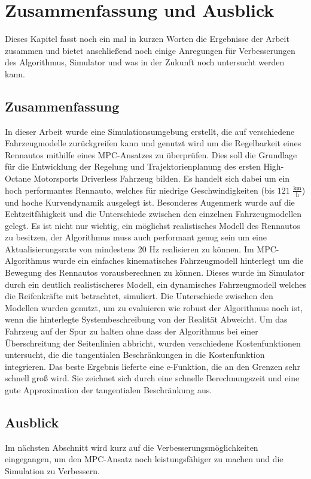 \documentclass{like}
\begin{document}
\chapter[Ausblick]{Zusammenfassung und Ausblick}
Dieses Kapitel fasst noch ein mal in kurzen Worten die Ergebnisse der Arbeit zusammen und bietet anschließend noch einige Anregungen für Verbesserungen des Algorithmus, Simulator und was in der Zukunft noch untersucht werden kann.
\section{Zusammenfassung}
In dieser Arbeit wurde eine Simulationsumgebung erstellt, die auf verschiedene Fahrzeugmodelle zurückgreifen kann und genutzt wird um die Regelbarkeit eines Rennautos mithilfe eines \ac{MPC}-Ansatzes zu überprüfen. Dies soll die Grundlage für die Entwicklung der Regelung und Trajektorienplanung des ersten High-Octane Motorsports Driverless Fahrzeug bilden. Es handelt sich dabei um ein hoch performantes Rennauto, welches für niedrige Geschwindigkeiten (bis $121$ $\frac{\text{km}}{\text{h}}$) und hoche Kurvendynamik ausgelegt ist. Besonderes Augenmerk wurde auf die Echtzeitfähigkeit und die Unterschiede zwischen den einzelnen Fahrzeugmodellen gelegt. Es ist nicht nur wichtig, ein möglichst realistisches Modell des Rennautos zu besitzen, der Algorithmus muss auch performant genug sein um eine Aktualisierungsrate von mindestens 20 Hz realisieren zu können. 
Im \ac{MPC}-Algorithmus wurde ein einfaches kinematisches Fahrzeugmodell hinterlegt um die Bewegung des Rennautos vorausberechnen zu können. Dieses wurde im Simulator durch ein deutlich realistischeres Modell, ein dynamisches Fahrzeugmodell welches die Reifenkräfte mit betrachtet, simuliert. Die Unterschiede zwischen den Modellen wurden genutzt, um zu evaluieren wie robust der Algorithmus noch ist, wenn die hinterlegte Systembeschreibung von der Realität Abweicht. Um das Fahrzeug auf der Spur zu halten ohne dass der Algorithmus bei einer Überschreitung der Seitenlinien abbricht, wurden verschiedene Kostenfunktionen untersucht, die die tangentialen Beschränkungen in die Kostenfunktion integrieren. Das beste Ergebnis lieferte eine e-Funktion, die an den Grenzen sehr schnell groß wird. Sie zeichnet sich durch eine schnelle Berechnungszeit und eine gute Approximation der tangentialen Beschränkung aus.

\section{Ausblick}
Im nächsten Abschnitt wird kurz auf die Verbesserungsmöglichkeiten eingegangen, um den \ac{MPC}-Ansatz noch leistungsfähiger zu machen und die Simulation zu Verbessern.
\end{document}
